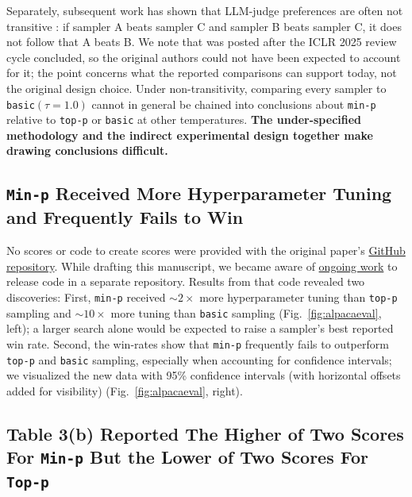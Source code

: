 Separately, subsequent work has shown that LLM-judge preferences are often not transitive \citep{xu2025investigatingnontransitivityllmasajudge}: if sampler A beats sampler C and sampler B beats sampler C, it does not follow that A beats B.
We note that \citet{xu2025investigatingnontransitivityllmasajudge} was posted after the ICLR 2025 review cycle concluded, so the original authors could not have been expected to account for it; the point concerns what the reported comparisons can support today, not the original design choice.
Under non-transitivity, comparing every sampler to \texttt{basic}$(\tau=1.0)$ cannot in general be chained into conclusions about \texttt{min-p} relative to \texttt{top-p} or \texttt{basic} at other temperatures. \textbf{The under-specified methodology and the indirect experimental design together make drawing conclusions difficult.}

\subsection{\texttt{Min-p} Received More Hyperparameter Tuning and Frequently Fails to Win}

No scores or code to create scores were provided with the original paper's \href{https://github.com/menhguin/minp_paper/issues/5}{GitHub repository}. While drafting this manuscript, we became aware of \href{https://github.com/IlyaGusev/quest/compare/main...menhguin:quest:main}{ongoing work} to release code in a separate repository. Results from that code revealed two discoveries: First, \texttt{min-p} received $\sim2\times$ more hyperparameter tuning than \texttt{top-p} sampling and $\sim 10\times$ more tuning than \texttt{basic} sampling (Fig.~\ref{fig:alpacaeval}, left); a larger search alone would be expected to raise a sampler's best reported win rate. Second, the win-rates show that \texttt{min-p} frequently fails to outperform \texttt{top-p} and \texttt{basic} sampling, especially when accounting for confidence intervals; we visualized the new data with 95\% confidence intervals (with horizontal offsets added for visibility) (Fig.~\ref{fig:alpacaeval}, right).


\subsection{Table 3(b) Reported The Higher of Two Scores For \texttt{Min-p} But the Lower of Two Scores For \texttt{Top-p}}

